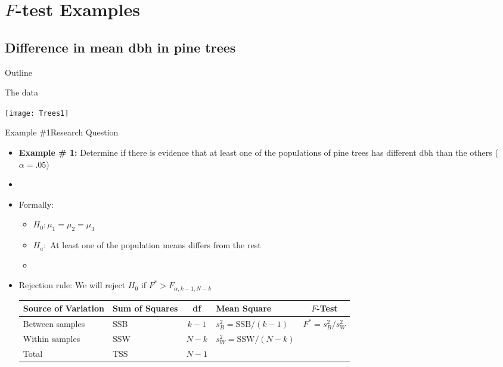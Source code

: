 \documentclass[xcolor=dvipsnames]{beamer}
\begin{document}
\section{$F$-test Examples}
\subsection{Difference in mean dbh in pine trees}

\begin{frame}{Outline}
	\tableofcontents[currentsection,subsectionstyle=show/shaded/hide]
\end{frame}

\begin{frame}{The data}
	\begin{center}
		\texttt{[image: Trees1]}
	\end{center}
\end{frame}

\begin{frame}{Example \#1}{Research Question}
	\begin{itemize}
		\item \textbf{Example \# 1:} Determine if there is evidence that at least one of the populations of pine trees has different dbh than the others ($\alpha = .05$)
		\item[]
		\item Formally:
		\begin{itemize}
			\item $H_0: \mu_1 = \mu_2 = \mu_3$
			\item $H_a:$ At least one of the population means differs from the rest
			\item[]
		\end{itemize}
		\item Rejection rule: We will reject $H_0$ if $F^* > F_{\alpha, k-1, N-k}$
			\vspace{2mm}
		\begin{center}
			{\scriptsize
				\begin{tabular}{lp{1.2cm}cp{2.5cm}c}
					\hline 
					\textbf{Source of Variation} & \textbf{Sum of Squares} & \textbf{df} & \textbf{Mean Square} & $F$-\textbf{Test} \\ \hline 
					Between samples & SSB & $k - 1$ & $s_B^2 = \text{SSB} / (k-1)$ & $F^* = s_B^2 / s_W^2$ \\
					Within samples & SSW & $N - k$ &  $s_W^2 = \text{SSW} / (N-k)$ & \\
					Total & TSS & $N-1$ & & \\ \hline
			\end{tabular}}
		\end{center}
	\end{itemize}
\end{frame}
\end{document}
